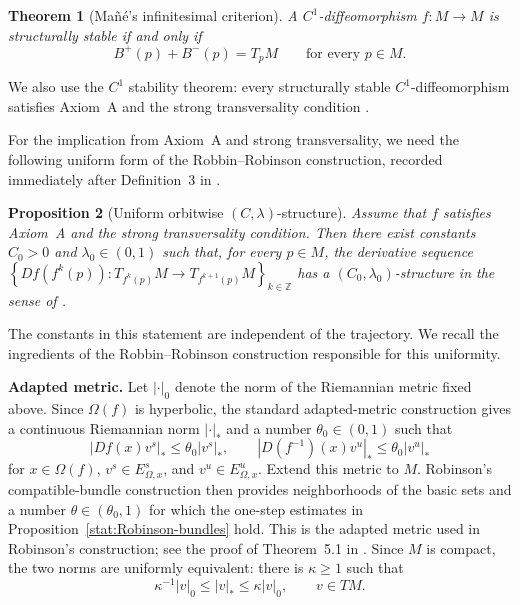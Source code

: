 \documentclass[12pt]{article}
\newcommand{\Zz}{\mathbb{Z}}
\newtheorem{thm}{Theorem}
\newtheorem{statement}[thm]{Proposition}
\theoremstyle{definition}
\begin{document}
\begin{thm}[Mañé's infinitesimal criterion]
\label{thm:app-Mane}
A $C^1$-diffeomorphism $f:M\to M$ is structurally stable if and only if
\begin{equation}
\label{eq:app-Mane}
B^+(p)+B^-(p)=T_pM
\qquad\text{for every }p\in M.
\end{equation}
\end{thm}

We also use the $C^1$ stability theorem: every structurally stable $C^1$-diffeomorphism satisfies Axiom~A and the strong transversality condition \cite{Mane1987}.

For the implication from Axiom~A and strong transversality, we need the following uniform form of the Robbin--Robinson construction, recorded immediately after Definition~3 in \cite[p.~277]{PilCL}.

\begin{statement}[Uniform orbitwise $(C,\lambda)$-structure] \label{stat:uniform-CL-finite}
Assume that $f$ satisfies Axiom~A and the strong transversality condition.
Then there exist constants $C_0>0$ and $\lambda_0\in(0,1)$ such that, for every $p\in M$, the derivative sequence
$
\left\{
Df(f^k(p)):T_{f^k(p)}M\to T_{f^{k+1}(p)}M
\right\}_{k\in\Zz}
$
has a $(C_0,\lambda_0)$-structure in the sense of \cite{PilCL}.
\end{statement}

The constants in this statement are independent of the trajectory.
We recall the ingredients of the Robbin--Robinson construction responsible for this uniformity.

\noindent\textbf{Adapted metric.}
Let $|\cdot|_0$ denote the norm of the Riemannian metric fixed above.
Since $\Omega(f)$ is hyperbolic, the standard adapted-metric construction
gives a continuous Riemannian norm $|\cdot|_*$ and a number
$\theta_0\in(0,1)$ such that
\[
|Df(x)v^s|_*\leq\theta_0|v^s|_*,
\qquad
|D(f^{-1})(x)v^u|_*\leq\theta_0|v^u|_*
\]
for $x\in\Omega(f)$, $v^s\in E_{\Omega,x}^s$, and
$v^u\in E_{\Omega,x}^u$. Extend this metric to $M$. Robinson's
compatible-bundle construction then provides neighborhoods of the basic sets and a number $\theta\in(\theta_0,1)$ for which the one-step estimates
in Proposition~\ref{stat:Robinson-bundles} hold. This is the adapted
metric used in Robinson's construction; see the proof of
Theorem~5.1 in \cite{Robinson1976}.
Since $M$ is compact, the two norms are uniformly equivalent: there is
$\kappa\geq1$ such that
\begin{equation}
\label{eq:app-equivalent-metrics}
\kappa^{-1}|v|_0\leq|v|_*\leq\kappa|v|_0,
\qquad v\in TM.
\end{equation}
\end{document}
